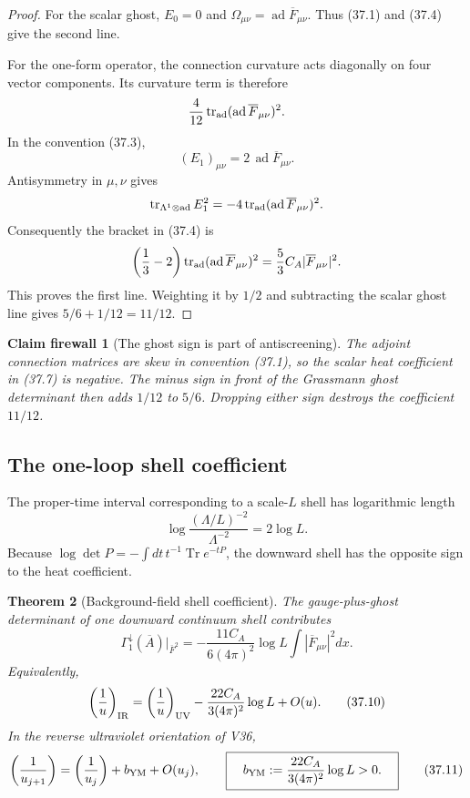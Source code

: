 \documentclass[11pt,oneside]{book}
\newtheorem{theorem}{Theorem}[chapter]
\newtheorem{firewall}[theorem]{Claim firewall}
\theoremstyle{definition}
\theoremstyle{remark}
\begin{document}
\begin{proof}
For the scalar ghost, \(E_0=0\) and
\(\Omega_{\mu\nu}=\operatorname{ad}\overline F_{\mu\nu}\).
Thus (37.1) and (37.4) give the second line.

For the one-form operator, the connection curvature acts diagonally
on four vector components.  Its curvature term is therefore
\[
 \frac4{12}
 \operatorname{tr}_{\rm ad}
 (\operatorname{ad}\overline F_{\mu\nu})^2.
\]
In the convention (37.3),
\[
 (E_1)_{\mu\nu}
 =2\,\operatorname{ad}\overline F_{\mu\nu}.
\]
Antisymmetry in \(\mu,\nu\) gives
\[
 \operatorname{tr}_{\Lambda^1\otimes{\rm ad}}E_1^2
 =
 -4\operatorname{tr}_{\rm ad}
 (\operatorname{ad}\overline F_{\mu\nu})^2.
\]
Consequently the bracket in (37.4) is
\[
 \left(\frac13-2\right)
 \operatorname{tr}_{\rm ad}
 (\operatorname{ad}\overline F_{\mu\nu})^2
 =
 \frac53C_A|\overline F_{\mu\nu}|^2.
\]
This proves the first line.  Weighting it by \(1/2\) and subtracting
the scalar ghost line gives
\(5/6+1/12=11/12\).
\end{proof}

\begin{firewall}[The ghost sign is part of antiscreening]
\label{fire:e8v37-ghost-sign}
The adjoint connection matrices are skew in convention (37.1), so
the scalar heat coefficient in (37.7) is negative.  The minus sign
in front of the Grassmann ghost determinant then adds
\(1/12\) to \(5/6\).  Dropping either sign destroys the coefficient
\(11/12\).
\end{firewall}

\subsection{The one-loop shell coefficient}

The proper-time interval corresponding to a scale-\(L\) shell has
logarithmic length
\[
 \log\frac{(\Lambda/L)^{-2}}{\Lambda^{-2}}=2\log L.              \tag{37.8}
\]
Because \(\log\det P=-\int dt\,t^{-1}\operatorname{Tr}e^{-tP}\),
the downward shell has the opposite sign to the heat coefficient.

\begin{theorem}[Background-field shell coefficient]
\label{thm:e8v37-shell}
The gauge-plus-ghost determinant of one downward continuum shell
contributes
\[
 \Gamma_1^{\downarrow}(\overline A)
 \big|_{\overline F^2}
 =
 -\frac{11C_A}{6(4\pi)^2}\log L
 \int|\overline F_{\mu\nu}|^2dx.                                \tag{37.9}
\]
Equivalently,
\[
 \left(\frac1u\right)_{\rm IR}
 =
 \left(\frac1u\right)_{\rm UV}
 -
 \frac{22C_A}{3(4\pi)^2}\log L+O(u).                            \tag{37.10}
\]
In the reverse ultraviolet orientation of V36,
\[
 \left(\frac1{u_{j+1}}\right)
 =
 \left(\frac1{u_j}\right)
 +b_{\rm YM}+O(u_j),\qquad
 \boxed{\quad
 b_{\rm YM}:=
 \frac{22C_A}{3(4\pi)^2}\log L>0.
 \quad}                                                         \tag{37.11}
\]
\end{theorem}
\end{document}

